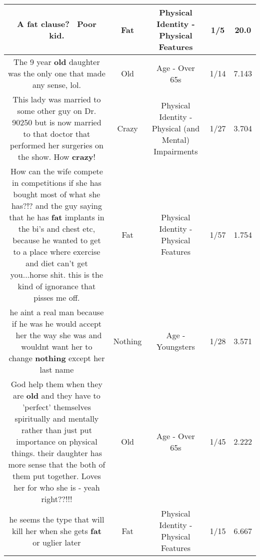 \documentclass[11pt]{article}
\newlength\mylength
\begin{document}
\begin{center}
\begin{longtable}{|C{.65\mylength}|C{.30\mylength}|C{.12\mylength}|C{.12\mylength}|C{.12\mylength}|}
  \small A \textbf{fat} clause?  Poor kid.\normalsize   & Fat & Physical Identity - Physical Features & 1/5 & 20.0 \\  \hline
  \small The 9 year \textbf{old} daughter was the only one that made any sense, lol.\normalsize   & Old & Age - Over 65s & 1/14 & 7.143 \\  \hline
  \small This lady was married to some other guy on Dr. 90250 but is now married to that doctor that performed her surgeries on the show. How \textbf{crazy}!\normalsize   & Crazy & Physical Identity - Physical (and Mental) Impairments & 1/27 & 3.704 \\  \hline
  \small How can the wife compete in competitions if she has bought most of what she has?!? and the guy saying that he has \textbf{fat} implants in the bi's and chest etc, because he wanted to get to a place where exercise and diet can't get you...horse shit. this is the kind of ignorance that pisses me off.\normalsize   & Fat & Physical Identity - Physical Features & 1/57 & 1.754 \\  \hline
  \small he aint a real man because if he was he would accept  her the way she was and wouldnt want her to change \textbf{nothing} except her last name\normalsize   & Nothing & Age - Youngsters & 1/28 & 3.571 \\  \hline
  \small God help them when they are \textbf{old} and they have to 'perfect' themselves spiritually and mentally rather than just put importance on physical things. their daughter has more sense that the both of them put together. Loves her for who she is - yeah right??!!!\normalsize   & Old & Age - Over 65s & 1/45 & 2.222 \\  \hline
  \small he seems the type that will kill her when she gets \textbf{fat} or uglier later\normalsize   & Fat & Physical Identity - Physical Features & 1/15 & 6.667 \\  \hline

\end{longtable}
\end{center}
\end{document}
